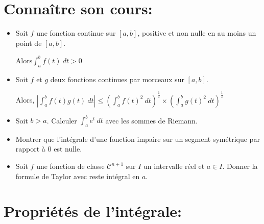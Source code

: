 \documentclass[a4paper,11pt]{article}
\theoremstyle{definition}
\begin{document}
 

\noindent{}

\smallskip
\section*{Connaître son cours:}
\begin{itemize}[$\bullet$]
	\item Soit $f$ une fonction continue sur $[a , b ] $, positive et non nulle en au moins un point de $[a , b ] $.
	
	Alors\quad  $\displaystyle\int_{a}^{b}f(t) ~ dt > 0$
	\item Soit $f$ et $g$ deux fonctions continues par morceaux sur $[a , b ] $.
	 
	Alors, \quad  $\displaystyle\left|\int_{a}^{b}f(t)g(t) ~ dt\right| \leq  \left(\int_{a}^{b}f(t)^2 ~ dt\right)^{\frac{1}{2}} \times \left(\int_{a}^{b}g(t)^2 ~ dt\right)^{\frac{1}{2}}$
	\item Soit $b > a $. Calculer $\displaystyle\int_{a}^{b} e^t ~ dt$ avec les sommes de Riemann.
	\item Montrer que l’intégrale d’une fonction impaire sur un segment symétrique par rapport à $0$ est nulle.
	\item Soit $f$ une fonction de classe $\mathcal C^{n+1}$ sur $I$ un intervalle réel et $a \in I $. Donner la formule de Taylor avec reste intégral en $a$. 
	

\end{itemize}
\raggedright

\section*{Propriétés de l’intégrale:}\hfill\\%
\end{document}
